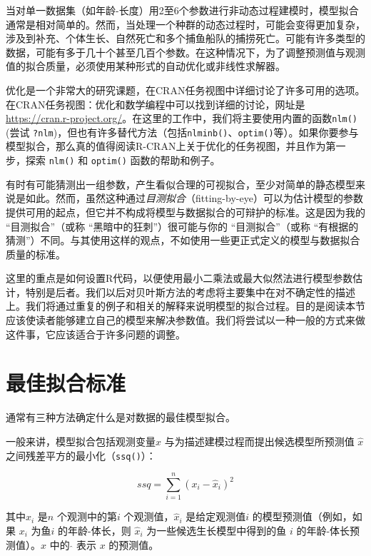 \documentclass[
  lang=cn,
  11pt,
  scheme=chinese,
  chinesefont=nofont,
  citestyle=gb7714-2015,
  bibstyle=gb7714-2015]{elegantbook}
\begin{document}
当对单一数据集（如年龄-长度）用2至6个参数进行非动态过程建模时，模型拟合通常是相对简单的。然而，当处理一个种群的动态过程时，可能会变得更加复杂，涉及到补充、个体生长、自然死亡和多个捕鱼船队的捕捞死亡。可能有许多类型的数据，可能有多于几十个甚至几百个参数。在这种情况下，为了调整预测值与观测值的拟合质量，必须使用某种形式的自动优化或非线性求解器。

优化是一个非常大的研究课题，在CRAN任务视图中详细讨论了许多可用的选项。在CRAN任务视图：优化和数学编程中可以找到详细的讨论，网址是\url{https://cran.r-project.org/}。在这里的工作中，我们将主要使用内置的函数\texttt{nlm()}(尝试 \texttt{?nlm})，但也有许多替代方法（包括\texttt{nlminb()}、\texttt{optim()}等）。如果你要参与模型拟合，那么真的值得阅读R-CRAN上关于优化的任务视图，并且作为第一步，探索 \texttt{nlm()} 和 \texttt{optim()} 函数的帮助和例子。

有时有可能猜测出一组参数，产生看似合理的可视拟合，至少对简单的静态模型来说是如此。然而，虽然这种通过\emph{目测拟合}（fitting-by-eye）可以为估计模型的参数提供可用的起点，但它并不构成将模型与数据拟合的可辩护的标准。这是因为我的 ``目测拟合''（或称 ``黑暗中的狂刺''）很可能与你的 ``目测拟合''（或称 ``有根据的猜测''）不同。与其使用这样的观点，不如使用一些更正式定义的模型与数据拟合质量的标准。

这里的重点是如何设置R代码，以便使用最小二乘法或最大似然法进行模型参数估计，特别是后者。我们以后对贝叶斯方法的考虑将主要集中在对不确定性的描述上。我们将通过重复的例子和相关的解释来说明模型的拟合过程。目的是阅读本节应该使读者能够建立自己的模型来解决参数值。我们将尝试以一种一般的方式来做这件事，它应该适合于许多问题的调整。

\section{最佳拟合标准}\label{ux6700ux4f73ux62dfux5408ux6807ux51c6}

通常有三种方法确定什么是对数据的最佳模型拟合。

一般来讲，模型拟合包括观测变量\(x\) 与为描述建模过程而提出候选模型所预测值 \(\hat x\) 之间残差平方的最小化（\texttt{ssq()}）：

\begin{equation}
ssq = \sum_{i=1}^n (x_i- \hat x_i)^2 
\label{eq:eq41}
\end{equation}

其中\(x_i\) 是\(n\) 个观测中的第\(i\) 个观测值，\(\hat x_i\) 是给定观测值\(i\) 的模型预测值（例如，如果 \(x_i\) 为鱼\(i\) 的年龄-体长，则 \(\hat x_i\) 为一些候选生长模型中得到的鱼 \(i\) 的年龄-体长预测值）。\(\hat x\) 中的 \(\hat{}\) 表示 \(x\) 的预测值。
\end{document}
